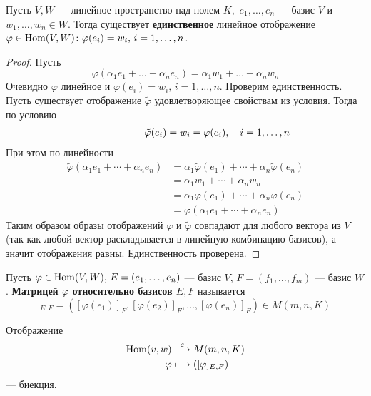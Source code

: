 \documentclass[../main.tex]{subfiles}
\begin{document}
\begin{theorem-non}
  Пусть $V, W$ --- линейное пространство над полем $K$,\ $e_1, \dotsc, e_n$ --- базис $V$ и $w_1, \dotsc, w_n \in W$. Тогда существует \textbf{единственное} линейное отображение $\varphi \in \operatorname{Hom}(V, W)\colon \varphi(e_i) = w_i,\, i = 1,\dotsc,n$.
\end{theorem-non}
\begin{proof}
  Пусть
  \begin{equation*}
    \varphi(\alpha_1 e_1 + \dotsc + \alpha_n e_n) = \alpha_1 w_1 + \dotsc + \alpha_n w_n
  \end{equation*}
  Очевидно $\varphi$ линейное и $\varphi(e_i) = w_i,\, i = 1,\dotsc,n$. Проверим единственность. Пусть существует отображение $\tilde{\varphi}$ удовлетворяющее свойствам из условия. Тогда по условию
  \begin{align*}
    \hphantom{,\quad i = 1,\dotsc, n}
    \tilde{\varphi}(e_i) = w_i = \varphi(e_i),\quad i = 1,\dotsc, n
  \end{align*}
  При этом по линейности
  \begin{align*}
    \tilde{\varphi}(\alpha_1 e_1 + \dotsb + \alpha_n  e_n)
    &=
    \alpha_1 \tilde{\varphi}(e_1) + \dotsb + \alpha_n \tilde{\varphi}(e_n)
    \\&=
    \alpha_1 w_1 + \dotsb + \alpha_n w_n
    \\&=
    \alpha_1 \varphi(e_1) + \dotsb + \alpha_n \varphi(e_n)
    \\&=
    \varphi(\alpha_1 e_1 + \dotsb + \alpha_n e_n)
  \end{align*}
  Таким образом образы отображений $\varphi$ и $\tilde{\varphi}$ совпадают для любого вектора из $V$(так как любой вектор раскладывается в линейную комбинацию базисов), а значит отображения равны. Единственность проверена.
\end{proof}

\begin{definition}
  Пусть $\varphi \in \operatorname{Hom}(V, W),\, E = (e_1, \dotsc, e_n)$ --- базис $V$, $F = (f_1, \dotsc, f_m)$ --- базис $W$. \textbf{Матрицей $\varphi$ относительно базисов $E, F$} называется
  \begin{equation*}
    [\varphi]_{E, F} = ([\varphi(e_1)]_F, [\varphi(e_2)]_F, \dotsc, [\varphi(e_n)]_F) \in M(m, n, K)
  \end{equation*}
\end{definition}

\begin{corollary*}
  Отображение
  \begin{align*}
    \operatorname{Hom}(v, w) &\overset{\varepsilon}{\longrightarrow} M(m, n, K) \\
    \varphi &\longmapsto([\varphi]_{E, F})
  \end{align*}
  --- биекция.
\end{corollary*}
\end{document}
